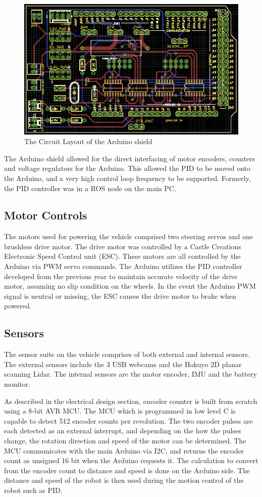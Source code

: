 \documentclass[11pt,journal]{IEEEtran}
\begin{document}
\begin{figure}[h]
\centerline{\includegraphics[width=0.9\columnwidth]{Shield.png}}
\caption{The Circuit Layout of the Arduino shield}
\label{Shield}
\end{figure}

The Arduino shield allowed for the direct interfacing of motor encoders, counters and voltage regulators for the Arduino. This allowed the PID to be moved onto the Arduino, and a very high control loop frequency to be supported. Formerly, the PID controller was in a ROS node on the main PC.

\subsection{Motor Controls}
The motors used for powering the vehicle comprised two steering servos and one brushless drive motor. The drive motor was controlled by a Castle Creations Electronic Speed Control unit (ESC). These motors are all controlled by the Arduino via PWM servo commands. The Arduino utilizes the PID controller developed from the previous year to maintain accurate velocity of the drive motor, assuming no slip condition on the wheels. In the event the Arduino PWM signal is neutral or missing, the ESC causes the drive motor to brake when powered.

\subsection{Sensors}
The sensor suite on the vehicle comprises of both external and internal sensors. The external sensors include the 3 USB webcams and the Hokuyo 2D planar scanning Lidar. The internal sensors are the motor encoder, IMU and the battery monitor.

As described in the electrical design section, encoder counter is built from scratch using a 8-bit AVR MCU. The MCU which is programmed in low level C is capable to detect 512 encoder counts per revolution. The two encoder pulses are each detected as an external interrupt, and depending on the how the pulses change, the rotation direction and speed of the motor can be determined. The MCU communicates with the main Arduino via I2C, and returns the encoder count as unsigned 16 bit when the Arduino requests it. The calculation to convert from the encoder count to distance and speed is done on the Arduino side. The distance and speed of the robot is then used during the motion control of the robot such as PID. 
\end{document}
